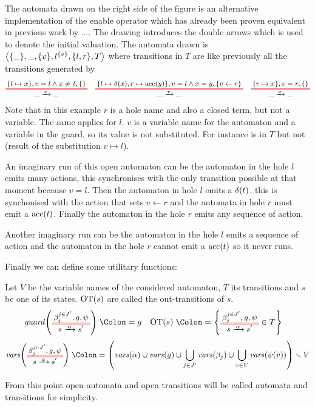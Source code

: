 \documentclass{article}
\begin{document}
\begin{exi}
The automata drawn on the right side of the figure is an alternative implementation of the enable operator which has already been proven equivalent in previous work by ....
The drawing introduces the double arrows which is used to denote the initial valuation.
The automata drawn is \(\left<{\left\{\_\right\}},\_,{\left\{v\right\}},l^{\left\{v\right\}},{\left\{l, r\right\}},T\right>\) where transitions in \(T\) are like previously all the transitions generated by
\begin{align*}
	\OT{\_}{\_}{x}{\mbrc{l \mapsto x}}{v = l \wedge x \neq \delta}{\mbrc{}} &&
	\OT{\_}{\_}{\tau}{\mbrc{l \mapsto \delta\mpar{x}, r \mapsto \act{acc}\mpar{y}}}{v = l \wedge x = y}{\mbrc{v \gets r}} &&
	\OT{\_}{\_}{x}{\mbrc{r \mapsto x}}{v = r}{\mbrc{}}
\end{align*}
Note that in this example \(r\) is a hole name and also a closed term, but not a variable.
The same applies for \(l\).
\(v\) is a variable name for the automaton and a variable in the guard, so its value is not substituted.
For instance  is in \(T\) but not  (result of the substitution \(v \mapsto l\)).

An imaginary run of this open automaton can be the automaton in the hole \(l\) emits many actions, this synchronises with the only transition possible at that moment because \(v = l\).
Then the automaton in hole \(l\) emits a \(\delta{\left(t\right)}\), this is synchonised with the action that sets \(v \gets r\) and the automata in hole \(r\) must emit a \(\mathrm{acc}{\left(t\right)}\).
Finally the automaton in the hole \(r\) emits any sequence of action.

Another imaginary run can be the automaton in the hole \(l\) emits a sequence of action and the automaton in the hole \(r\) cannot emit a \(\mathrm{acc}{\left(t\right)}\) so it never runs.
\end{exi}

Finally we can define some utilitary functions:
\begin{defi}
Let \(V\) be the variable names of the considered automaton, \(T\) its transitions and \(s\) be one of its states.
\(\mathrm{OT}{\left(s\right)}\) are called the out-transitions of \(s\).
\begin{align*}
	\fguard{\OTg} & \defnotation g &
	\fOT{s} & \defnotation \mbrc{\OTg \in T}
\end{align*}
\[ \fvars{\OTg} \defnotation \mpar{\fvars{\alpha} \cup \fvars{g} \cup \bigcup_{j \in J'} \fvars{\beta_j} \cup \bigcup_{v \in V} \fvars{\psi\mpar{v}}} \setminus V \]
\end{defi}
From this point open automata and open transitions will be called automata and transitions for simplicity.
\end{document}

